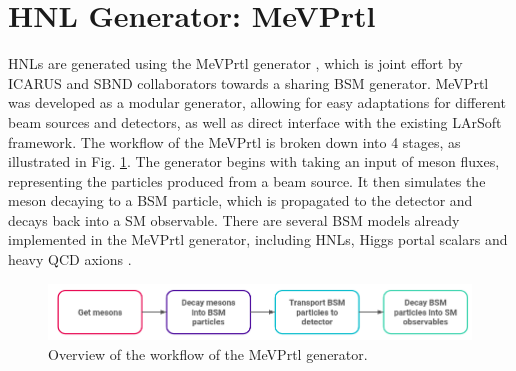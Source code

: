 \section{HNL Generator: MeVPrtl}
\label{sec:gen_mevprtl}

HNLs are generated using the MeVPrtl generator \cite{}, which is joint effort by ICARUS and SBND collaborators towards a sharing BSM generator.
MeVPrtl was developed as a modular generator, allowing for easy adaptations for different beam sources and detectors, as well as direct interface with the existing LArSoft framework.
The workflow of the MeVPrtl is broken down into 4 stages, as illustrated in Fig. \ref{fig:MeVPrtl_Workflow}.
The generator begins with taking an input of meson fluxes, representing the particles produced from a beam source.
It then simulates the meson decaying to a BSM particle, which is propagated to the detector and decays back into a SM observable.
There are several BSM models already implemented in the MeVPrtl generator, including HNLs, Higgs portal scalars \cite{} and heavy QCD axions \cite{}.


\begin{figure}[htbp!] 
\centering    
\includegraphics[width=1.0\textwidth]{MeVPrtl_Workflow}
\caption[MeVPrtl_Workflow]{
Overview of the workflow of the MeVPrtl generator.
}
\label{fig:MeVPrtl_Workflow}
\end{figure}

